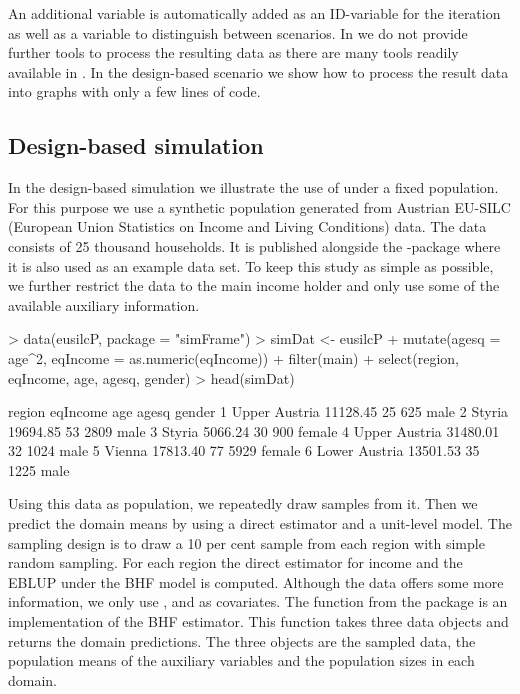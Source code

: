 \documentclass[article]{ajs}
\begin{document}
An additional variable  is automatically added as an ID-variable for the iteration as well as a variable  to distinguish between scenarios. In  we do not provide further tools to process the resulting data as there are many tools readily available in . In the design-based scenario we show how to process the result data into graphs with only a few lines of code.

\subsection{Design-based simulation}
\label{sec:csDesign}

In the design-based simulation we illustrate the use of  under a fixed population. For this purpose we use a synthetic population generated from Austrian EU-SILC (European Union Statistics on Income and Living Conditions) data. The data consists of 25 thousand households. It is published alongside the -package  \citep{Alf10} where it is also used as an example data set. To keep this study as simple as possible, we further restrict the data to the main income holder and only use some of the available auxiliary information.

\begin{Schunk}
\begin{Sinput}
> data(eusilcP, package = "simFrame")
> simDat <- eusilcP %
+   mutate(agesq = age^2, eqIncome = as.numeric(eqIncome)) %
+   filter(main) %
+   select(region, eqIncome, age, agesq, gender)
> head(simDat)
\end{Sinput}
\begin{Soutput}
         region eqIncome age agesq gender
1 Upper Austria 11128.45  25   625   male
2        Styria 19694.85  53  2809   male
3        Styria  5066.24  30   900 female
4 Upper Austria 31480.01  32  1024   male
5        Vienna 17813.40  77  5929 female
6 Lower Austria 13501.53  35  1225   male
\end{Soutput}
\end{Schunk}

Using this data as population, we repeatedly draw samples from it. Then we predict the domain means by using a direct estimator and a unit-level model. The sampling design is to draw a 10 per cent sample from each region with simple random sampling. For each region the direct estimator for income and the EBLUP under the BHF model is computed. Although the data offers some more information, we only use ,  and  as covariates. The function  from the package  is an implementation of the BHF estimator. This function takes three data objects and returns the domain predictions. The three objects are the sampled data, the population means of the auxiliary variables and the population sizes in each domain. 
\end{document}
